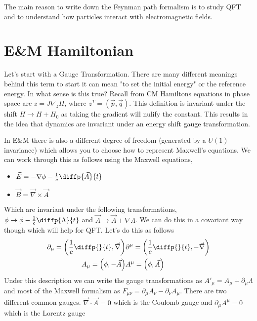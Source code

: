 The main reason to write down the Feynman path formalism is to study QFT and to understand
how particles interact with electromagnetic fields.

\section{E\&M Hamiltonian}
Let's start with a Gauge Transformation. There are many different meanings behind this term
to start it can mean "to set the initial energy" or the reference energy. In what sense
is this true? Recall from CM Hamiltons equations in phase space are
$\dot{z} = J \nabla_z H$, where $z^T = \left(\vec{p}, \vec{q}\right)$. This
definition is invariant under the shift $H \rightarrow H + H_0$ as taking the gradient
will nulify the constant. This results in the idea that
{\color{red} dynamics are invariant under an energy shift gauge transformation}.

In E\&M there is also a different degree of freedom (generated by a $U(1)$ invariance)
which allows you to choose how to represent Maxwell's equations. We can work through
this as follows using the Maxwell equations,
\begin{itemize}
    \item $\vec{E} = - \nabla \phi - \frac{1}{c} \diffp{\vec{A}}{t}$
    \item $\vec{B} = \vec{\nabla} \times \vec{A}$
\end{itemize}
Which are invariant under the following transformations,
$\phi \rightarrow \phi - \frac{1}{c} \diffp{\Lambda}{t}$ and
$\vec{A} \rightarrow \vec{A} + \nabla \Lambda$. We can do this in a covariant
way though which will help for QFT. Let's do this as follows
\begin{align*}
    \partial_{\mu} = \left(\frac{1}{c} \diffp{}{t}, \vec{\nabla}\right) &
    \partial^{\mu} = \left(\frac{1}{c} \diffp{}{t}, -\vec{\nabla}\right) \\
    A_{\mu} = \left(\phi, -\vec{A}\right) &
    A^{\mu} = \left(\phi, \vec{A}\right)
\end{align*}
Under this description we can write the gauge transformations as
$A'_{\mu} = A_{\mu} + \partial_{\mu} \Lambda$ and most of the
Maxwell formalism as $F_{\mu \nu} = \partial_{\mu} A_{\nu} - \partial_{\nu} A_{\mu}$.
There are two different common gauges.
$\vec{\nabla} \cdot \vec{A} = 0$ which is the Coulomb gauge and
$\partial_{\mu} A^{\mu} = 0$ which is the Lorentz gauge
